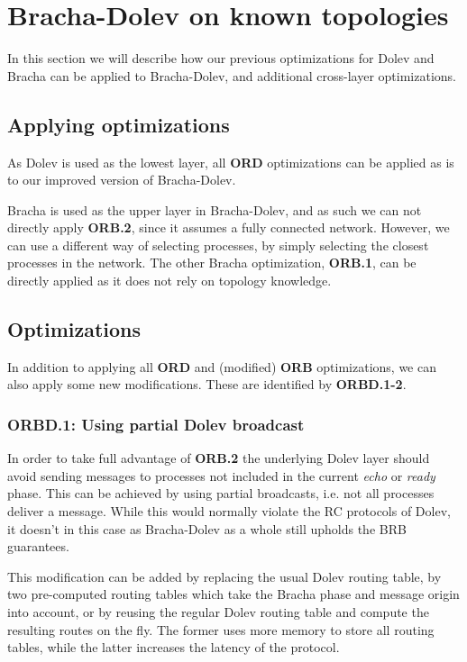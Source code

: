 
\section{Bracha-Dolev on known topologies}
\label{contr-bracha-dolev}
In this section we will describe how our previous optimizations for Dolev and Bracha can be applied to Bracha-Dolev, and additional cross-layer optimizations.

\subsection{Applying optimizations}
As Dolev is used as the lowest layer, all \textbf{ORD} optimizations can be applied as is to our improved version of Bracha-Dolev.

Bracha is used as the upper layer in Bracha-Dolev, and as such we can not directly apply \textbf{ORB.2}, since it assumes a fully connected network. However, we can use a different way of selecting processes, by simply selecting the closest processes in the network.
The other Bracha optimization, \textbf{ORB.1}, can be directly applied as it does not rely on topology knowledge.

\subsection{Optimizations}
In addition to applying all \textbf{ORD} and (modified) \textbf{ORB} optimizations, we can also apply some new modifications. These are identified by \textbf{ORBD.1-2}.

\subsubsection{ORBD.1: Using partial Dolev broadcast}
In order to take full advantage of \textbf{ORB.2} the underlying Dolev layer should avoid sending messages to processes not included in the current \textit{echo} or \textit{ready} phase. This can be achieved by using partial broadcasts, i.e. not all processes deliver a message. While this would normally violate the RC protocols of Dolev, it doesn't in this case as Bracha-Dolev as a whole still upholds the BRB guarantees.

This modification can be added by replacing the usual Dolev routing table, by two pre-computed routing tables which take the Bracha phase and message origin into account, or by reusing the regular Dolev routing table and compute the resulting routes on the fly. The former uses more memory to store all routing tables, while the latter increases the latency of the protocol.

